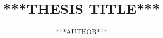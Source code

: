 \documentclass{ucrthesis-1chair}
\title{***THESIS TITLE***}
\author{***AUTHOR***}
\begin{document}
\maketitle

\copyrightpage{}

\approvalpage{}
\cleardoublepage


\begin{frontmatter}
	\setcounter{page}{4}


	
	\cleardoublepage


	
	\cleardoublepage

	
	\cleardoublepage

	\tableofcontents
	\cleardoublepage


	\listoffigures
	\cleardoublepage


	\listoftables
	\cleardoublepage

\end{frontmatter}




\end{document}

